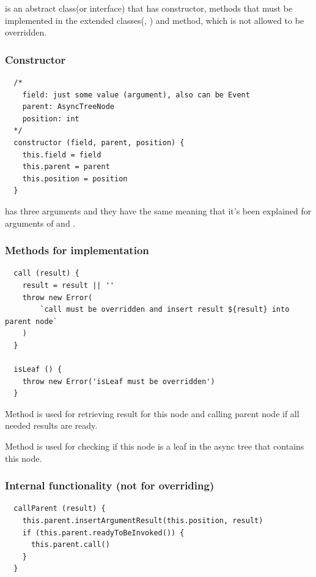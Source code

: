 \documentclass{article}
\begin{document}
 is an abstract class(or interface) that has constructor, methods that must be implemented in the extended classes(, ) and method, which is not allowed to be overridden.

\subsubsection{Constructor}

\begin{verbatim}
  /*
    field: just some value (argument), also can be Event
    parent: AsyncTreeNode
    position: int
  */
  constructor (field, parent, position) {
    this.field = field
    this.parent = parent
    this.position = position
  }
\end{verbatim}

 has three arguments and they have the same meaning that it's been explained for arguments of  and .

\vspace*{10px}

\subsubsection{Methods for implementation}

\begin{verbatim}
  call (result) {
    result = result || ''
    throw new Error(
        `call must be overridden and insert result ${result} into parent node`
    )
  }

  isLeaf () {
    throw new Error('isLeaf must be overridden')
  }
\end{verbatim}

Method  is used for retrieving result for this node and calling parent node if all needed results are ready.

Method  is used for checking if this node is a leaf in the async tree that contains this node.

\vspace*{10px}

\subsubsection{Internal functionality (not for overriding)}

\begin{verbatim}
  callParent (result) {
    this.parent.insertArgumentResult(this.position, result)
    if (this.parent.readyToBeInvoked()) {
      this.parent.call()
    }
  }
\end{verbatim}
\end{document}

